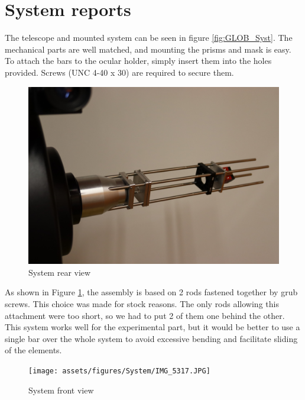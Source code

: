 \section{System reports}
The telescope and mounted system can be seen in figure \ref{fig:GLOB_Syst}. 
The mechanical parts are well matched, and mounting the prisms and mask is easy. \newline
To attach the bars to the ocular holder, simply insert them into the holes provided. Screws (UNC 4-40 x 30) 
are required to secure them. 
\begin{figure}[H]
    \centering
    \includegraphics[scale=0.05]{assets/figures/System/IMG_5312.JPG}
    \caption{System rear view}
    \label{fig:GLOB_Barres}
\end{figure}
As shown in Figure \ref{fig:GLOB_Barres}, the assembly is based on 2 rods fastened together by grub screws. 
This choice was made for stock reasons. The only rods allowing this attachment were too short, 
so we had to put 2 of them one behind the other. 
This system works well for the experimental part, but it would be better to use a single bar over the whole system to 
avoid excessive bending and facilitate sliding of the elements.
\begin{figure}[H]
    \centering
    \texttt{[image: assets/figures/System/IMG\_5317.JPG]}
    \caption{System front view}
    \label{fig:GLOB_JSP}
\end{figure}
